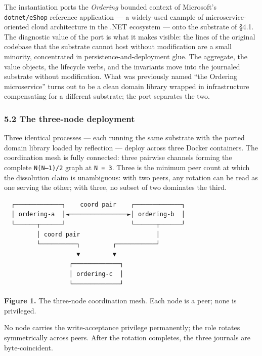 \documentclass[
]{article}
\newcounter{none} %
\begin{document}
The instantiation ports the \emph{Ordering} bounded context of
Microsoft's \texttt{dotnet/eShop} reference application --- a
widely-used example of microservice-oriented cloud architecture in the
.NET ecosystem --- onto the substrate of §4.1. The diagnostic value of
the port is what it makes visible: the lines of the original codebase
that the substrate cannot host without modification are a small
minority, concentrated in persistence-and-deployment glue. The
aggregate, the value objects, the lifecycle verbs, and the invariants
move into the journaled substrate without modification. What was
previously named ``the Ordering microservice'' turns out to be a clean
domain library wrapped in infrastructure compensating for a different
substrate; the port separates the two.

\subsubsection{5.2 The three-node
deployment}\label{the-three-node-deployment}

Three identical processes --- each running the same substrate with the
ported domain library loaded by reflection --- deploy across three
Docker containers. The coordination mesh is fully connected: three
pairwise channels forming the complete \texttt{N(N–1)/2} graph at
\texttt{N\ =\ 3}. Three is the minimum peer count at which the
dissolution claim is unambiguous: with two peers, any rotation can be
read as one serving the other; with three, no subset of two dominates
the third.

\begin{verbatim}
  ┌─────────────┐    coord pair    ┌─────────────┐
  │ ordering-a  │◄────────────────►│ ordering-b  │
  └──────┬──────┘                  └──────┬──────┘
         │ coord pair                     │
         └──────────┐         ┌───────────┘
                    ▼         ▼
                  ┌─────────────┐
                  │ ordering-c  │
                  └─────────────┘
\end{verbatim}

\textbf{Figure 1.} The three-node coordination mesh. Each node is a
peer; none is privileged.

No node carries the write-acceptance privilege permanently; the role
rotates symmetrically across peers. After the rotation completes, the
three journals are byte-coincident.
\end{document}
